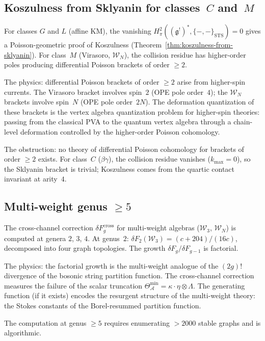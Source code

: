 \documentclass[11pt]{article}
\newcommand{\cA}{\mathcal{A}}
\newcommand{\cW}{\mathcal{W}}
\newcommand{\fg}{\mathfrak{g}}
\begin{document}
\subsection{Koszulness from Sklyanin for classes~$C$ and~$M$}

For classes $G$ and $L$ (affine KM), the vanishing
$H^2_\pi((\fg^!)^*, \{-,-\}_{\mathrm{STS}}) = 0$ gives a Poisson-geometric
proof of Koszulness (Theorem~\ref{thm:koszulness-from-sklyanin}).
For class~$M$ (Virasoro, $\cW_N$), the collision residue has higher-order
poles producing differential Poisson brackets of order $\geq 2$.

The physics: differential Poisson brackets of order $\geq 2$ arise from
higher-spin currents.  The Virasoro bracket involves spin~$2$ (OPE pole
order~$4$); the $\cW_N$ brackets involve spin~$N$ (OPE pole order~$2N$).
The deformation quantization of these brackets is the vertex algebra
quantization problem for higher-spin theories: passing from the
classical PVA to the quantum vertex algebra through a chain-level
deformation controlled by the higher-order Poisson cohomology.

The obstruction: no theory of differential Poisson cohomology for
brackets of order $\geq 2$ exists.  For class~$C$ ($\beta\gamma$),
the collision residue vanishes ($k_{\max} = 0$), so the Sklyanin
bracket is trivial; Koszulness comes from the quartic contact invariant
at arity~$4$.

\subsection{Multi-weight genus $\geq 5$}

The cross-channel correction $\delta F_g^{\mathrm{cross}}$ for
multi-weight algebras ($\cW_3$, $\cW_N$) is computed at genera
$2$, $3$, $4$.  At genus~$2$:
$\delta F_2(\cW_3) = (c+204)/(16c)$, decomposed into four graph
topologies.  The growth $\delta F_g / \delta F_{g-1}$ is factorial.

The physics: the factorial growth is the multi-weight analogue of the
$(2g)!$ divergence of the bosonic string partition function.  The
cross-channel correction measures the failure of the scalar truncation
$\Theta_\cA^{\min} = \kappa \cdot \eta \otimes \Lambda$.  The generating
function (if it exists) encodes the resurgent structure of the
multi-weight theory: the Stokes constants of the Borel-resummed
partition function.

The computation at genus $\geq 5$ requires enumerating $> 2000$ stable
graphs and is algorithmic.
\end{document}
